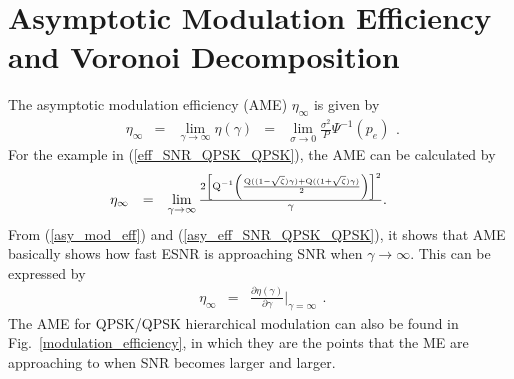 \documentclass[10pt,fleqn, twocolumn]{IEEEtran}
\begin{document}
\section{Asymptotic Modulation Efficiency and Voronoi Decomposition}
The asymptotic modulation efficiency (AME) $\eta_{\infty}$ is
given by
\begin{equation}
\begin{array}{rcccl}
\eta_{\infty}&=&\lim\limits_{\gamma\rightarrow\infty}\eta\left(\gamma\right)&=&\lim\limits_{\sigma\rightarrow0}\frac{\sigma^2}{P}\Psi^{-1}\left(p_{e}\right)
\end{array}.\label{asy_mod_eff}
\end{equation}
\noindent For the example in (\ref{eff_SNR_QPSK_QPSK}), the AME
can be calculated by
\begin{equation}\hspace{-0.225in}
\begin{array}{rcl}
\eta_{\infty}&=&\lim\limits_{\gamma\rightarrow\infty}\frac{2\left[{\rm
Q}^{-1}\left(\frac{{\rm Q}((1-\sqrt{\zeta})\gamma)+{\rm
Q}((1+\sqrt{\zeta})\gamma)}{2}\right)\right]^2}{\gamma}.
\end{array}\label{asy_eff_SNR_QPSK_QPSK}
\end{equation}
\noindent From (\ref{asy_mod_eff}) and
(\ref{asy_eff_SNR_QPSK_QPSK}), it shows that AME basically shows
how fast ESNR is approaching SNR when $\gamma\rightarrow\infty$.
This can be expressed by
\begin{equation}
\begin{array}{rcl}
\eta_{\infty}&=&\frac{\partial\eta\left(\gamma\right)}{\partial\gamma}|_{\gamma=\infty}
\end{array}.\label{asy_mod_eff2}
\end{equation}
\noindent The AME for QPSK/QPSK hierarchical modulation can also
be found in Fig.~\ref{modulation_efficiency}, in which they are
the points that the ME are approaching to when SNR becomes larger
and larger.
\end{document}
